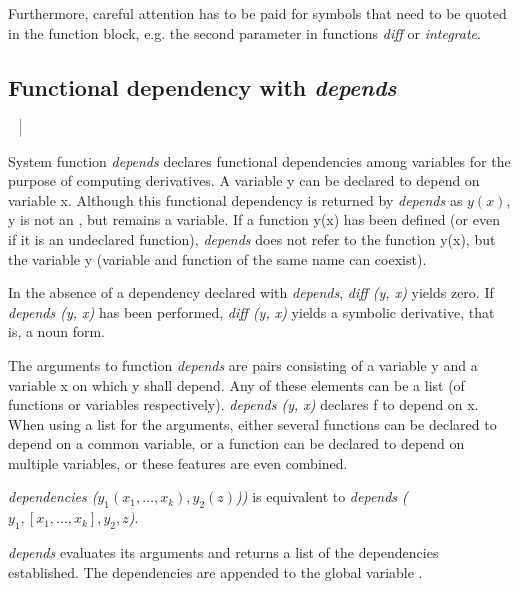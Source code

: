 \documentclass[../Maxima_Workbook.tex]{subfiles}
\begin{document}
\lz Furthermore, careful attention has to be paid for symbols that need to be quoted in the function block, e.g. the second parameter in functions \emph{diff} or \emph{integrate}.

\subsection{Functional dependency with \emph{depends}}

\lz {} $ \en \gbar $ \hfill \tcr{[function]} \\
 \hfill \tcr{[function]}

\lz System function \emph{depends} declares functional dependencies among variables for the purpose of computing derivatives. A variable y can be declared to depend on variable x. Although this functional dependency is returned by \emph{depends} as $ y(x) $, y is not an , but remains a variable. If a function y(x) has been defined (or even if it is an undeclared function), \emph{depends} does not refer to the function y(x), but the variable y (variable and function of the same name can coexist).

\lz In the absence of a dependency declared with \emph{depends}, \emph{diff (y, x)} yields zero. If \emph{depends (y, x)} has been performed, \emph{diff (y, x)} yields a symbolic derivative, that is, a noun form.

\lz The arguments to function \emph{depends} are pairs consisting of a variable y and a variable x on which y shall depend. Any of these elements can be a list (of functions or variables respectively). \emph{depends (y, x)} declares f to depend on x. When using a list for the arguments, either several functions can be declared to depend on a common variable, or a function can be declared to depend on multiple variables, or these features are even combined.

\lz \emph{dependencies ($ y_1(x_1,\dots,x_k) ,y_2(z)$))} is equivalent to \emph{depends ($ y_1,[x_1,\dots,x_k],y_2,z $)}.

\lz \emph{depends} evaluates its arguments and returns a list of the dependencies established. The dependencies are appended to the global variable .
\end{document}
